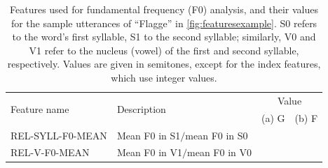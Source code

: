 %		
		
		\begin{table}%
		
		\caption[Features used for fundamental frequency (F0) analysis%
		]{%
		Features used for fundamental frequency (F0) analysis, and their values for the sample utterances of ``Flagge'' in \cref{fig:featuresexample}. 
		S0 refers to the word's first syllable, S1 to the second syllable; similarly, V0 and V1 refer to the nucleus (vowel) of the first and second syllable, respectively.
		Values are given in semitones, except for the index features, which use integer values.
		}
		{\renewcommand{\arraystretch}{1.25}%
		\begin{tabularx}{\textwidth}%
			{lXrr}
		\toprule
		\multirow{2}{*}{Feature name} 
									& \multirow{2}{*}{Description}
													& \multicolumn{2}{c}{Value} \\						
					  				&							&  (a) G		& (b) F
					  																																\\
		\midrule
		REL-SYLL-F0-MEAN 
			& Mean F0 in S1$/$mean F0 in S0
			& \color{red}{TD}    & \color{red}{TD} \\
		REL-V-F0-MEAN 
			& Mean F0 in V1$/$mean F0 in V0

\end{tabularx}}
\end{table}
